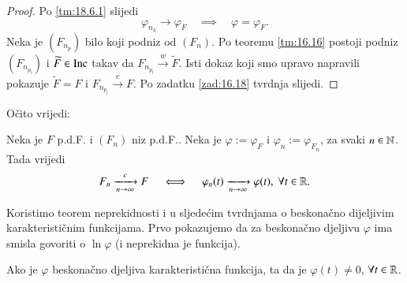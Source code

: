 \begin{proof}
    Po \ref{tm:18.6.1} slijedi
    \begin{equation*}
        \varphi_{n_k} \to \varphi_F \quad \implies \quad \varphi = \varphi_F.
    \end{equation*}
    Neka je $(F_{n_p})$ bilo koji podniz od $(F_n)$.
    Po teoremu \ref{tm:16.16} postoji podniz $(F_{n_{p_l}})$ i $\widetilde{F} \in \mathrm{Inc}$ takav da $F_{n_{p_l}} \xrightarrow{w} \widetilde{F}$.
    Isti dokaz koji smo upravo napravili pokazuje $\widetilde{F} = F$ i $F_{n_{p_l}} \xrightarrow{c} F$.
    Po zadatku \ref{zad:16.18} tvrdnja slijedi.
\end{proof}

O\v cito vrijedi:

\begin{kor} \label{kor:18.7}
    Neka je $F$ p.d.F. i $(F_n)$ niz p.d.F..
    Neka je $\varphi := \varphi_F$ i $\varphi_n := \varphi_{F_n}$, za svaki $n \in \mathbb{N}$.
    Tada vrijedi
    \begin{equation*}
        F_n \xrightarrow[n \to \infty]{c} F \quad \iff \quad \varphi_n (t) \xrightarrow[n \to \infty]{} \varphi (t), \; \forall t \in \mathbb{R}.
    \end{equation*}
\end{kor}

Koristimo teorem neprekidnosti i u sljede\' cim tvrdnjama o beskona\v cno dijeljivim karakteristi\v cnim funkcijama.
Prvo pokazujemo da za beskona\v cno djeljivu $\varphi$ ima smisla govoriti o $\ln \varphi$ (i neprekidna je funkcija).

\begin{prop}    \label{prop:18.8}
    Ako je $\varphi$ beskona\v cno djeljiva karakteristi\v cna funkcija, ta da je $\varphi (t) \neq 0$, $\forall t \in \mathbb{R}$.
\end{prop}

